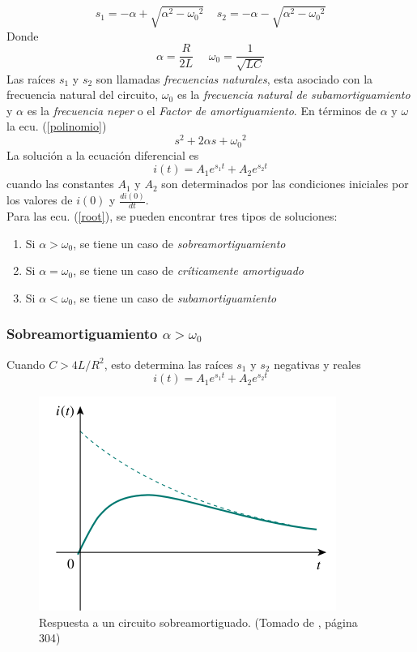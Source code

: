 \documentclass[twocolumn]{IEEEtran}
\begin{document}
\begin{equation}
 {s_1} =  - \alpha  + \sqrt {{\alpha ^2} - {\omega _0}^2} \ \ \ \ \ {s_2} =  - \alpha  - \sqrt {{\alpha ^2} - {\omega _0}^2}
\end{equation}
\noindent
Donde
\begin{equation}
 \alpha  = \frac{R}{{2L}}\ \ \ \ \ \ {\omega _0} = \frac{1}{{\sqrt {LC} }}
\end{equation}
\noindent
Las raíces $s_1$ y $s_2$ son llamadas \textit{frecuencias naturales}, esta asociado con la frecuencia natural del circuito, $\omega _0$ es la \textit{frecuencia natural de subamortiguamiento} y $\alpha$ es la \textit{frecuencia neper} o el \textit{Factor de amortiguamiento}. En términos de $\alpha$ y $\omega$ la ecu. (\ref{polinomio})
\begin{equation}
 s^2 + 2 \alpha s + {\omega _0} ^ {2}
\end{equation}
\noindent
La solución a la ecuación diferencial es
\begin{equation}
 i(t) = A_1{e ^{s_1 t}} + A_2{e ^{s_2 t}}
\label{solve}
\end{equation}
\noindent
cuando las constantes $A_1$ y $A_2$ son determinados por las condiciones iniciales por los valores de $i(0)$ y $\frac{di(0)}{dt}$.\\
Para las ecu. (\ref{root}), se pueden encontrar tres tipos de soluciones:
\begin{enumerate}
 \item Si $\alpha > \omega _0$, se tiene un caso de \textit{sobreamortiguamiento}
 \item Si $\alpha = \omega _0$, se tiene un caso de \textit{críticamente amortiguado}
 \item Si $\alpha < \omega _0$, se tiene un caso de \textit{subamortiguamiento}
\end{enumerate}

\subsubsection*{Sobreamortiguamiento $\alpha > \omega _0$}
\noindent
Cuando $C > 4L/{R^2}$, esto determina las raíces $s_1$ y $s_2$ negativas y reales
\begin{equation}
 i(t) = A_1{e ^{s_1 t}} + A_2{e ^{s_2 t}}
\end{equation}
\begin{figure}[H]
	\centering
		\includegraphics[scale=0.5]{sobre.png}
	\caption{Respuesta a un circuito sobreamortiguado. (Tomado de \cite{sadiku}, página 304)}
	\label{subamortiguado}
\end{figure}
\end{document}
